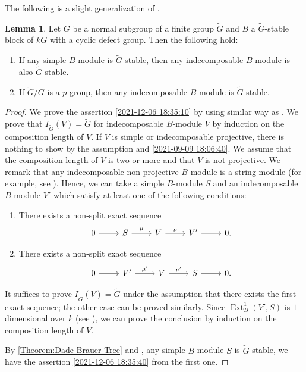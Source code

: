 \documentclass[pdftex,a4paper]{article}
\numberwithin{equation}{subsection}
\theoremstyle{definition}
\newtheorem{lemma}[theorem]{Lemma}
\newcommand{\Ext}{\operatorname{Ext}\nolimits}
\newcommand{\decompgp}{I}
\begin{document}
The following is a slight generalization of \cite[Lemma 3.22]{MR4243358}.
\begin{lemma}%
	Let \(G\) be a normal subgroup of a finite group \(\tilde{G}\)  and \(B\) a \(\tilde{G}\)-stable block of \(kG\) with a cyclic defect group. Then the following hold:
	\begin{enumerate}
		\item If any simple \(B\)-module is \(\tilde{G}\)-stable, then any indecomposable \(B\)-module is also \(\tilde{G}\)-stable.\label{2021-12-06 18:35:10}
		\item If \(\tilde{G}/G\) is a \(p\)-group, then any indecomposable \(B\)-module is \(\tilde{G}\)-stable.\label{2021-12-06 18:35:40}
	\end{enumerate}
\end{lemma}
\begin{proof}
	We prove the assertion \ref{2021-12-06 18:35:10} by using similar way as \cite[Lemma 3.22]{MR4243358}.
	We prove that \(\decompgp_{\tilde{G}}(V)=\tilde{G}\) for indecomposable \(B\)-module \(V\) by induction on the composition length of \(V\).
	If \(V\) is simple or indecomposable projective, there is nothing to show by the assumption and \cref{2021-09-09 18:06:40}.
	We assume that the composition length of \(V\) is two or more and that \(V\) is not projective.
	We remark that any indecomposable non-projective \(B\)-module is a string module (for example, see \cite{MR3823391}).
	Hence, we can take a simple \(B\)-module \(S\) and an indecomposable \(B\)-module \(V'\) which satisfy at least one of the following conditions:
	\begin{enumerate}
		\item There exists a non-split exact sequence
		      \begin{equation}
			      \begin{tikzcd}
				      0 \ar[r] & S \ar[r,"\mu"] & V \ar[r,"\nu"] & V'  \ar[r] & 0.
			      \end{tikzcd}
		      \end{equation}
		\item There exists a non-split exact sequence
		      \begin{equation}
			      \begin{tikzcd}
				      0 \ar[r] & V' \ar[r,"\mu'"] & V \ar[r,"\nu'"] & S \ar[r] & 0.
			      \end{tikzcd}
		      \end{equation}
	\end{enumerate}
	It suffices to prove \(\decompgp_{\tilde{G}}(V)=\tilde{G}\) under the assumption that there exists the first exact sequence;
	the other case can be proved similarly.
	Since \(\Ext_B^1(V',S)\) is \(1\)-dimensional over \(k\) (see \cite[Proposition 21.7]{MR860771}),
	we can prove the conclusion by induction on the composition length of \(V\).

	By \cref{Theorem:Dade Brauer Tree} and \cite[Lemma 2.2]{MR2592757},
	any simple \(B\)-module \(S\) is \(\tilde{G}\)-stable,
	we have the assertion \ref{2021-12-06 18:35:40} from the first one.
\end{proof}
\end{document}
